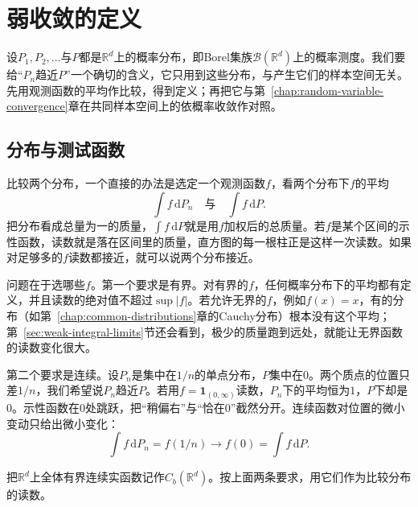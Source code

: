 \section{弱收敛的定义}
\label{sec:weak-definition}

设$P_1,P_2,\dots$与$P$都是$\mathbb{R}^{d}$上的概率分布，即Borel集族$\mathcal{B}(\mathbb{R}^{d})$上的概率测度。我们要给“$P_n$趋近$P$”一个确切的含义，它只用到这些分布，与产生它们的样本空间无关。先用观测函数的平均作比较，得到定义；再把它与第~\ref{chap:random-variable-convergence}章在共同样本空间上的依概率收敛作对照。

\subsection{分布与测试函数}
\label{sec:weak-test-functions}

比较两个分布，一个直接的办法是选定一个观测函数$f$，看两个分布下$f$的平均
\[
 \int f\,\mathrm{d}P_n\quad\text{与}\quad\int f\,\mathrm{d}P .
\]
把分布看成总量为一的质量，$\int f\,\mathrm{d}P$就是用$f$加权后的总质量。若$f$是某个区间的示性函数，读数就是落在区间里的质量，直方图的每一根柱正是这样一次读数。如果对足够多的$f$读数都接近，就可以说两个分布接近。

问题在于选哪些$f$。第一个要求是有界。对有界的$f$，任何概率分布下的平均都有定义，并且读数的绝对值不超过$\sup\lvert f\rvert$。若允许无界的$f$，例如$f(x)=x$，有的分布（如第~\ref{chap:common-distributions}章的Cauchy分布）根本没有这个平均；第~\ref{sec:weak-integral-limits}节还会看到，极少的质量跑到远处，就能让无界函数的读数变化很大。

第二个要求是连续。设$P_n$是集中在$1/n$的单点分布，$P$集中在$0$。两个质点的位置只差$1/n$，我们希望说$P_n$趋近$P$。若用$f=\mathbf{1}_{(0,\infty)}$读数，$P_n$下的平均恒为$1$，$P$下却是$0$。示性函数在$0$处跳跃，把“稍偏右”与“恰在$0$”截然分开。连续函数对位置的微小变动只给出微小变化：
\[
 \int f\,\mathrm{d}P_n=f(1/n)\longrightarrow f(0)=\int f\,\mathrm{d}P .
\]

把$\mathbb{R}^{d}$上全体有界连续实函数记作$C_b(\mathbb{R}^{d})$。按上面两条要求，用它们作为比较分布的读数。

